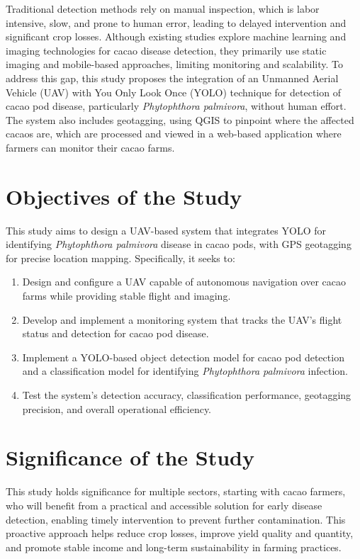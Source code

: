 {Traditional detection methods rely on manual inspection, which is labor intensive, slow, and prone to human error, leading to delayed intervention and significant crop losses. Although existing studies explore machine learning and imaging technologies for cacao disease detection, they primarily use static imaging and mobile-based approaches, limiting monitoring and scalability. To address this gap, this study proposes the integration of an Unmanned Aerial Vehicle (UAV) with You Only Look Once (YOLO) technique for detection of cacao pod disease, particularly \textit{Phytophthora palmivora}, without human effort. The system also includes geotagging, using QGIS to pinpoint where the affected cacaos are, which are processed and viewed in a web-based application where farmers can monitor their cacao farms.

\section{Objectives of the Study}

This study aims to design a UAV-based system that integrates YOLO for identifying \textit{Phytophthora palmivora} disease in cacao pods, with GPS geotagging for precise location mapping. Specifically, it seeks to:

\begin{enumerate}
	\item Design and configure a UAV capable of autonomous navigation over cacao farms while providing stable flight and imaging.
	\item Develop and implement a monitoring system that tracks the UAV’s flight status and detection for cacao pod disease.
	\item Implement a YOLO-based object detection model for cacao pod detection and a classification model for identifying \textit{Phytophthora palmivora} infection.
	\item Test the system’s detection accuracy, classification performance, geotagging precision, and overall operational efficiency.
\end{enumerate}

\section{Significance of the Study}

This study holds significance for multiple sectors, starting with cacao farmers, who will benefit from a practical and accessible solution for early disease detection, enabling timely intervention to prevent further contamination. This proactive approach helps reduce crop losses, improve yield quality and quantity, and promote stable income and long-term sustainability in farming practices.

}
